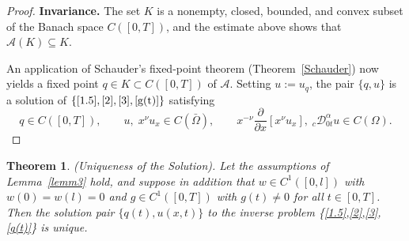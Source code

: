 \documentclass[reqno]{amsart}
\newtheorem{thm}{Theorem}[section]
\theoremstyle{definition}
\numberwithin{equation}{section}
\begin{document}
\begin{proof}
\textbf{Invariance.}
The set $K$ is a nonempty, closed, bounded, and convex subset of the
Banach space $C([0,T])$, and the estimate above shows that $\mathcal{A}(K)\subseteq K$.

An application of Schauder's fixed-point theorem (Theorem~\ref{Schauder})
now yields a fixed point $q\in K\subset C([0,T])$ of $\mathcal{A}$.
Setting $u:=u_q$, the pair $\{q,u\}$ is a solution of
$\{\eqref{1.5},\eqref{2},\eqref{3},\eqref{g(t)}\}$ satisfying
\begin{equation*}
    q\in C([0,T]),\qquad
    u,\;x^\nu u_x\in C(\bar{\Omega}),\qquad
    x^{-\nu}\frac{\partial}{\partial x}[x^\nu u_x],\;
    {}_{c}\mathcal{D}_{0t}^\alpha u\in C(\Omega).
\end{equation*}
\end{proof}


\begin{thm}
(Uniqueness of the Solution). Let the assumptions of Lemma~\ref{lemm3} hold, and suppose in addition that
$w \in C^1([0,l])$ with $w(0)=w(l)=0$ and $g \in C^1([0,T])$ with $g(t) \neq 0$ for all $t \in [0,T]$.
Then the solution pair $\{q(t), u(x,t)\}$ to the inverse problem
\{\eqref{1.5},\eqref{2},\eqref{3},\eqref{g(t)}\} is unique.
\end{thm} 
\end{document}
